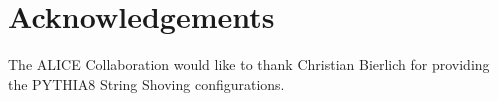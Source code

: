 \documentclass[ALICE,manyauthors]{cernphprep}
\begin{document}
\newenvironment{acknowledgement}{\relax}{\relax}
\begin{acknowledgement}
\section*{Acknowledgements}
\noindent The ALICE Collaboration would like to thank Christian Bierlich for providing the PYTHIA8 String Shoving configurations.
\end{acknowledgement}

\newpage
\appendix



\clearpage




%     
\end{document}
